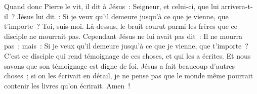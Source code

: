 \begin{multicols}{2}
Quand donc Pierre le vit, il dit à Jésus~: Seigneur, et celui-ci, que lui arrivera-t-il~?
Jésus lui dit~: Si je veux qu'il demeure jusqu'à ce que je vienne, que t'importe~? Toi, suis-moi.
Là-dessus, le bruit courut parmi les frères que ce disciple ne mourrait pas. Cependant Jésus ne lui avait pas dit~: Il ne mourra pas~; mais~: Si je veux qu'il demeure jusqu'à ce que je vienne, que t'importe~?
C'est ce disciple qui rend témoignage de ces choses, et qui les a écrites. Et nous savons que son témoignage est digne de foi.
Jésus a fait beaucoup d'autres choses~; si on les écrivait en détail, je ne pense pas que le monde même pourrait contenir les livres qu'on écrirait. Amen~!
\PPE{}
\end{multicols}

